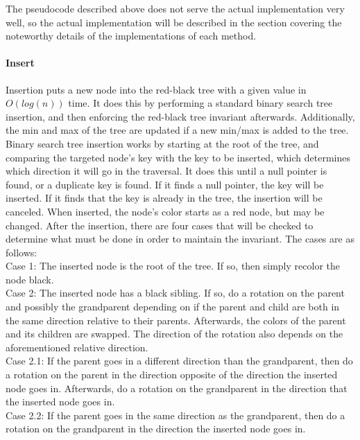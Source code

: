 \documentclass{article}
\begin{document}
\noindent
The pseudocode described above does not serve the actual implementation very well, so the actual implementation will be described in the section covering the noteworthy details of the implementations of each method.
\\

\paragraph{Insert}

\noindent
Insertion puts a new node into the red-black tree with a given value in $O(log(n))$ time. It does this by performing a standard binary search tree insertion, and then enforcing the red-black tree invariant afterwards. Additionally, the min and max of the tree are updated if a new min/max is added to the tree. Binary search tree insertion works by starting at the root of the tree, and comparing the targeted node’s key with the key to be inserted, which determines which direction it will go in the traversal. It does this until a null pointer is found, or a duplicate key is found. If it finds a null pointer, the key will be inserted. If it finds that the key is already in the tree, the insertion will be canceled. When inserted, the node’s color starts as a red node, but may be changed. After the insertion, there are four cases that will be checked to determine what must be done in order to maintain the invariant. The cases are as follows:
\\

\noindent
Case 1: The inserted node is the root of the tree. If so, then simply recolor the node black.
\\

\noindent
Case 2: The inserted node has a black sibling. If so, do a rotation on the parent and possibly the grandparent depending on if the parent and child are both in the same direction relative to their parents. Afterwards, the colors of the parent and its children are swapped. The direction of the rotation also depends on the aforementioned relative direction.
\\

\noindent
Case 2.1: If the parent goes in a different direction than the grandparent, then do a rotation on the parent in the direction opposite of the direction the inserted node goes in. Afterwards, do a rotation on the grandparent in the direction that the inserted node goes in.
\\

\noindent
Case 2.2: If the parent goes in the same direction as the grandparent, then do a rotation on the grandparent in the direction the inserted node goes in. 
\\
\end{document}
